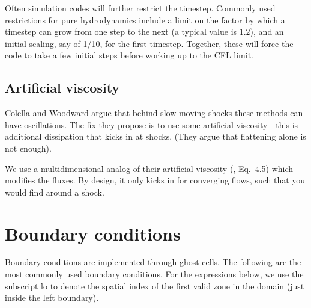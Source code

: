 Often simulation codes will further restrict the timestep.  Commonly
used restrictions for pure hydrodynamics include a limit on the factor
by which a timestep can grow from one step to the next (a typical
value is $1.2$), and an initial scaling, say of 1/10, for the first
timestep.  Together, these will force the code to take a few initial
steps before working up to the CFL limit.

\subsection{Artificial viscosity}

Colella and Woodward argue that behind slow-moving shocks these
methods can have oscillations.  The fix they propose is to use some
artificial viscosity---this is additional dissipation that kicks in at
shocks.  (They argue that flattening alone is not enough).

We use a multidimensional analog of their artificial viscosity
(\cite{colellawoodward:1984}, Eq.\ 4.5) which modifies the fluxes.  By
design, it only kicks in for converging flows, such that you would
find around a shock.


\section{Boundary conditions}

Boundary conditions are implemented through ghost cells.  The following
are the most commonly used boundary conditions.  For the expressions
below, we use the subscript $\mathrm{lo}$ to denote the spatial index
of the first valid zone in the domain (just inside the left boundary).

